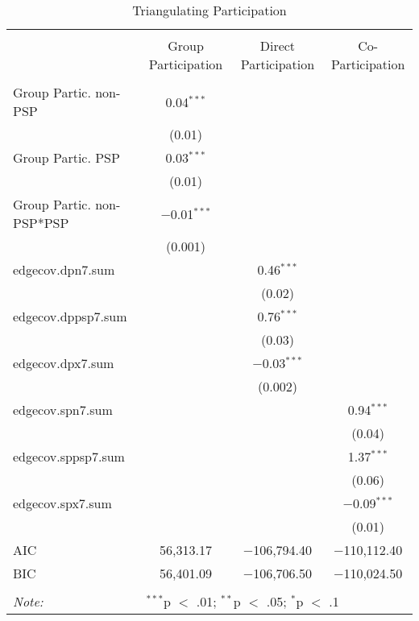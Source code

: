 
\begin{table}[!htbp] \centering 
  \caption{Triangulating Participation} 
  \label{table:partmods} 
\begin{tabular}{@{\extracolsep{5pt}}lccc} 
\\[-1.8ex]\hline \\[-1.8ex] 
 & Group Participation & Direct Participation & Co-Participation \\ 
\hline \\[-1.8ex] 
 Group Partic. non-PSP & 0.04$^{***}$ &  &  \\ 
  & (0.01) &  &  \\ 
  Group Partic. PSP & 0.03$^{***}$ &  &  \\ 
  & (0.01) &  &  \\ 
  Group Partic. non-PSP*PSP & $-$0.01$^{***}$ &  &  \\ 
  & (0.001) &  &  \\ 
  edgecov.dpn7.sum &  & 0.46$^{***}$ &  \\ 
  &  & (0.02) &  \\ 
  edgecov.dppsp7.sum &  & 0.76$^{***}$ &  \\ 
  &  & (0.03) &  \\ 
  edgecov.dpx7.sum &  & $-$0.03$^{***}$ &  \\ 
  &  & (0.002) &  \\ 
  edgecov.spn7.sum &  &  & 0.94$^{***}$ \\ 
  &  &  & (0.04) \\ 
  edgecov.sppsp7.sum &  &  & 1.37$^{***}$ \\ 
  &  &  & (0.06) \\ 
  edgecov.spx7.sum &  &  & $-$0.09$^{***}$ \\ 
  &  &  & (0.01) \\ 
 AIC & 56,313.17 & $-$106,794.40 & $-$110,112.40 \\ 
BIC & 56,401.09 & $-$106,706.50 & $-$110,024.50 \\ 
\hline \\[-1.8ex] 
\textit{Note:} & \multicolumn{3}{l}{$^{***}$p $<$ .01; $^{**}$p $<$ .05; $^{*}$p $<$ .1} \\ 
\end{tabular} 
\end{table} 
